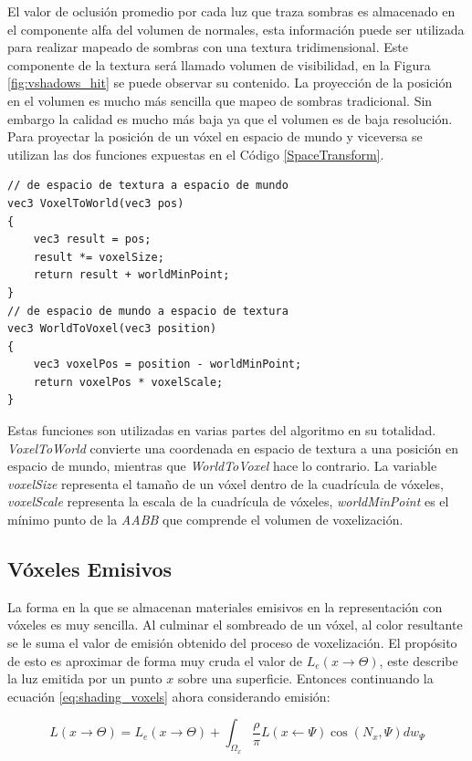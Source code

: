 El valor de oclusión promedio por cada luz que traza sombras es almacenado en el componente alfa del volumen de normales, esta información puede ser utilizada para realizar mapeado de sombras con una textura tridimensional. Este componente de la textura será llamado volumen de visibilidad, en la Figura \ref{fig:vshadows_hit} se puede observar su contenido. La proyección de la posición en el volumen es mucho más sencilla que mapeo de sombras tradicional. Sin embargo la calidad es mucho más baja ya que el volumen es de baja resolución. Para proyectar la posición de un vóxel en espacio de mundo y viceversa se utilizan las dos funciones expuestas en el Código \ref{SpaceTransform}.
\\
\begin{lstlisting}[caption={Transformación de espacio entre coordenadas de textura y posiciones de mundo.}, label=SpaceTransform]
// de espacio de textura a espacio de mundo
vec3 VoxelToWorld(vec3 pos)
{
	vec3 result = pos;
	result *= voxelSize;
	return result + worldMinPoint;
}
// de espacio de mundo a espacio de textura
vec3 WorldToVoxel(vec3 position)
{
    vec3 voxelPos = position - worldMinPoint;
    return voxelPos * voxelScale;
}
\end{lstlisting}

Estas funciones son utilizadas en varias partes del algoritmo en su totalidad. \emph{VoxelToWorld} convierte una coordenada en espacio de textura a una posición en espacio de mundo, mientras que \emph{WorldToVoxel} hace lo contrario. La variable \emph{voxelSize} representa el tamaño de un vóxel dentro de la cuadrícula de vóxeles, \emph{voxelScale} representa la escala de la cuadrícula de vóxeles, \emph{worldMinPoint} es el mínimo punto de la \emph{AABB} que comprende el volumen de voxelización.

\subsection{Vóxeles Emisivos}
La forma en la que se almacenan materiales emisivos en la representación con vóxeles es muy sencilla. Al culminar el sombreado de un vóxel, al color resultante se le suma el valor de emisión obtenido del proceso de voxelización. El propósito de esto es aproximar de forma muy cruda el valor de $L_e(x\to\Theta)$, este describe la luz emitida por un punto $x$ sobre una superficie. Entonces continuando la ecuación \ref{eq:shading_voxels} ahora considerando emisión:

\begin{equation}
		L(x\to\Theta) = L_e(x\to\Theta) + \int_{\Omega_{x}}{\frac{\rho}{\pi}L(x\gets\Psi)\cos(N_{x}, \Psi)dw_{\Psi}}
\end{equation}

